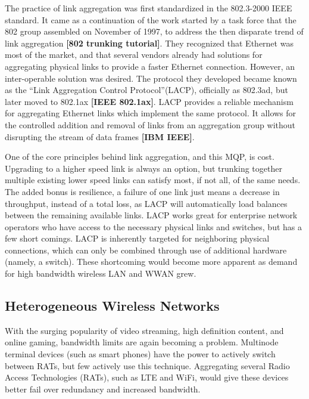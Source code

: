 \documentclass[12pt]{article}
\newcommand{\lcite}[1]
{{\bfseries\color{orange}[#1]}}
\begin{document}
	The practice of link aggregation was first standardized in the 802.3-2000 IEEE standard. It came as a continuation of the work started by a task force that the 802 group assembled on November of 1997, to address the then disparate trend of link aggregation \lcite{802 trunking tutorial}. They recognized that Ethernet was most of the market, and that several vendors already had solutions for aggregating physical links to provide a faster Ethernet connection. However, an inter-operable solution was desired. The protocol they developed became known as the ``Link Aggregation Control Protocol''(LACP), officially as 802.3ad, but later moved to 802.1ax \lcite{IEEE 802.1ax}. LACP provides a reliable mechanism for aggregating Ethernet links which implement the same protocol. It allows for the controlled addition and removal of links from an aggregation group without disrupting the stream of data frames \lcite{IBM IEEE}.

	One of the core principles behind link aggregation, and this MQP, is cost. Upgrading to a higher speed link is always an option, but trunking together multiple existing lower speed links can satisfy most, if not all, of the same needs. The added bonus is resilience, a failure of one link just means a decrease in throughput, instead of a total loss, as LACP will automatically load balances between the remaining available links. LACP works great for enterprise network operators who have access to the necessary physical links and switches, but has a few short comings. LACP is inherently targeted for neighboring physical connections, which can only be combined through use of additional hardware (namely, a switch). These shortcoming would become more apparent as demand for high bandwidth wireless LAN and WWAN grew.

\subsection{Heterogeneous Wireless Networks}

	With the surging popularity of video streaming, high definition content, and online gaming, bandwidth limits are again becoming a problem. Multinode terminal devices (such as smart phones) have the power to actively switch between RATs, but few actively use this technique. Aggregating several Radio Access Technologies (RATs), such as LTE and WiFi, would give these devices better fail over redundancy and increased bandwidth. 
\end{document}
